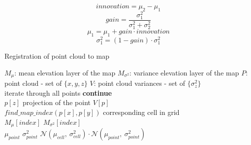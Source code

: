 \begin{itemize}
        \begin{equation}
            innovation = \mu_2 - \mu_1
        \end{equation}
        \begin{equation}
            gain = \frac {\sigma^2_1} {\sigma^2_1 + \sigma^2_2}
        \end{equation}
        \begin{equation}
            \mu_1 = \mu_1 + gain \cdot innovation
        \end{equation}
        \begin{equation}
            \sigma^2_1 = \left( 1 - gain \right) \cdot \sigma^2_1
        \end{equation}

        \begin{algorithm}
            \caption{Registration of point cloud to map}
            \label{alg:map_update}
            \begin{algorithmic}[1]
                \State $M_\mu$: mean elevation layer of the map
                \State $M_{\sigma^2}$: variance elevation layer of the map
                \State $P$: point cloud - set of $\{x, y, z\}$
                \State $V$: point cloud variances - set of $\{\sigma^2_z\}$ \\

                    \Comment iterate through all points
                        \State \textbf{continue}
                    \EndIf \\

                     {$p[z]$}
                    \Comment projection of the point
                     {$V[p]$} \\

                     {$find\_map\_index(p[x], p[y])$}
                    \Comment corresponding cell in grid \\

                     {$M_\mu[index]$}
                     {$M_{\sigma^2}[index]$} \\

                         {$\mu_{point}$}
                         {$\sigma^2_{point}$}
                    \Else
                            {$\mathcal{N}(\mu_{cell} ,\ \sigma^2_{cell}) \cdot
                                \mathcal{N}(\mu_{point} ,\ \sigma^2_{point})$}
                            \label{op:fuse}
                    \EndIf \\


\end{algorithmic}
\end{algorithm}
\end{itemize}

